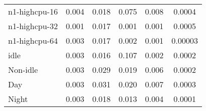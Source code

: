 \begin{table}[]
\begin{tabular}{lccccc}
n1-highcpu-16                                    & 0.004                                   & 0.018                           & 0.075                                & 0.008                                                                                    & 0.0004                                                                            \\
n1-highcpu-32                                    & 0.001                                   & 0.017                           & 0.001                                & 0.001                                                                                    & 0.0005                                                                            \\
n1-highcpu-64                                    & 0.003                                   & 0.017                           & 0.002                                & 0.001                                                                                    & 0.00003                                                                           \\
idle                                             & 0.003                                   & 0.016                           & 0.107                                & 0.002                                                                                    & 0.0002                                                                            \\
Non-idle                                         & 0.003                                   & 0.029                           & 0.019                                & 0.006                                                                                    & 0.0002                                                                            \\
Day                                              & 0.003                                   & 0.031                           & 0.020                                & 0.007                                                                                    & 0.0003                                                                            \\
Night                                            & 0.003                                   & 0.018                           & 0.013                                & 0.004                                                                                    & 0.0001                                                                            \\

\end{tabular}
\end{table}
